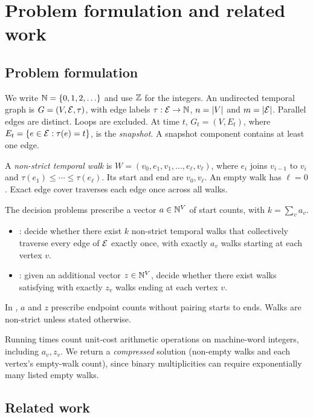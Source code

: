 \section{Problem formulation and related work}\label{sec:prelim}

\subsection{Problem formulation}\label{sec:problem}

We write $\mathbb{N}=\{0,1,2,\ldots\}$ and use $\mathbb{Z}$ for the integers. An undirected temporal graph is $G=(V,\mathcal{E},\tau)$, with edge labels $\tau:\mathcal{E}\to\mathbb{N}$, $n=\lvert V\rvert$ and $m=\lvert \mathcal{E}\rvert$. Parallel edges are distinct. Loops are excluded. At time $t$, $G_t=(V,E_t)$, where $E_t=\{e\in\mathcal{E}:\tau(e)=t\}$, is the \emph{snapshot}. A snapshot component contains at least one edge.

A \emph{non-strict temporal walk} is $W=(v_0,e_1,v_1,\ldots,e_\ell,v_\ell)$, where $e_i$ joins $v_{i-1}$ to $v_i$ and $\tau(e_1)\le\cdots\le\tau(e_\ell)$. Its start and end are $v_0,v_\ell$. An empty walk has $\ell=0$. Exact edge cover traverses each edge once across all walks.

The decision problems prescribe a vector $a\in\mathbb{N}^V$ of start counts, with $k=\sum_v a_v$.

\begin{definition}\label{def:problems}
\begin{itemize}
\item \FREE{}: decide whether there exist $k$ non-strict temporal walks that collectively traverse every edge of $\mathcal{E}$ exactly once, with exactly $a_v$ walks starting at each vertex $v$.
\item \FIX{}: given an additional vector $z\in\mathbb{N}^V$, decide whether there exist walks satisfying \FREE{} with exactly $z_v$ walks ending at each vertex $v$.
\end{itemize}
\end{definition}

In \FIX{}, $a$ and $z$ prescribe endpoint counts without pairing starts to ends. Walks are non-strict unless stated otherwise.

Running times count unit-cost arithmetic operations on machine-word integers, including $a_v,z_v$. We return a \emph{compressed} solution (non-empty walks and each vertex's empty-walk count), since binary multiplicities can require exponentially many listed empty walks.

\subsection{Related work}\label{sec:related}

